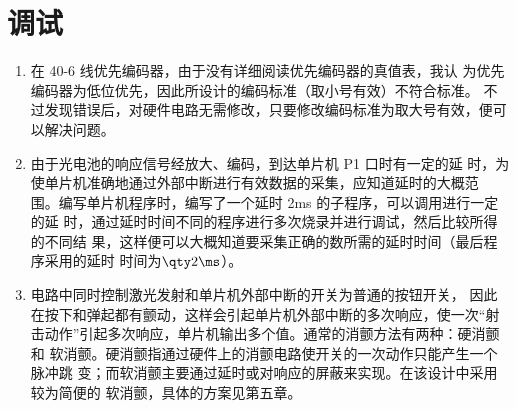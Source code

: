 \section{调试}

\begin{enumerate}
  \item 在 40-6 线优先编码器，由于没有详细阅读优先编码器的真值表，我认
  为优先编码器为低位优先，因此所设计的编码标准（取小号有效）不符合标准。
  不过发现错误后，对硬件电路无需修改，只要修改编码标准为取大号有效，便可
  以解决问题。
  \item 由于光电池的响应信号经放大、编码，到达单片机 P1 口时有一定的延
  时，为使单片机准确地通过外部中断进行有效数据的采集，应知道延时的大概范
  围。编写单片机程序时，编写了一个延时 2ms 的子程序，可以调用进行一定的延
  时，通过延时时间不同的程序进行多次烧录并进行调试，然后比较所得的不同结
  果，这样便可以大概知道要采集正确的数所需的延时时间（最后程序采用的延时
  时间为$\qty2\ms$）。
  \item 电路中同时控制激光发射和单片机外部中断的开关为普通的按钮开关，
  因此在按下和弹起都有颤动，这样会引起单片机外部中断的多次响应，使一次``射
  击动作''引起多次响应，单片机输出多个值。通常的消颤方法有两种：硬消颤和
  软消颤。硬消颤指通过硬件上的消颤电路使开关的一次动作只能产生一个脉冲跳
  变；而软消颤主要通过延时或对响应的屏蔽来实现。在该设计中采用较为简便的
  软消颤，具体的方案见第五章。
\end{enumerate}